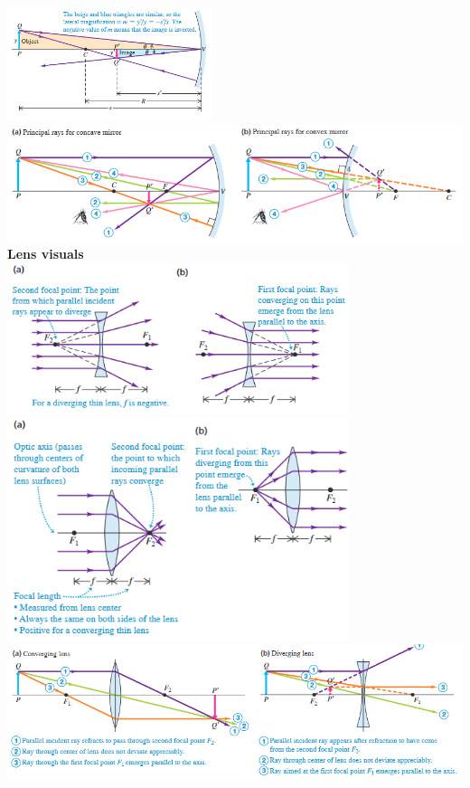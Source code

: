 \documentclass{article}
\begin{document}
\includegraphics[width=6cm]{mirror.png} \\
\includegraphics[width=20cm]{principal.png} \\
\textbf{Lens visuals} \\
\includegraphics[width=10cm]{concave_lens.png}
\includegraphics[width=10cm]{convex_lens.png} \\
\includegraphics[width=20cm]{principal_lens.png} \\
\end{document}
